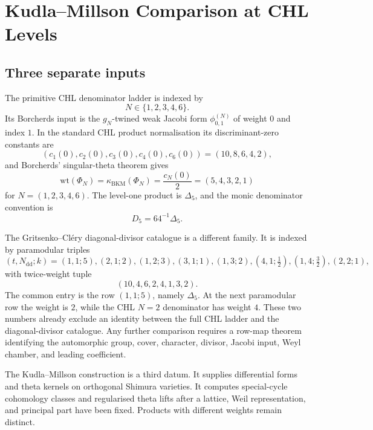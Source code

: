 \providecommand{\kBKM}{\kappa_{\mathrm{BKM}}}
\providecommand{\kch}{\kappa_{\mathrm{ch}}}
\providecommand{\kcat}{\kappa_{\mathrm{cat}}}
\providecommand{\kfib}{\kappa_{\mathrm{fiber}}}
\providecommand{\Sp}{\mathrm{Sp}}
\providecommand{\GSpin}{\mathrm{GSpin}}
\providecommand{\Sh}{\mathrm{Sh}}
\providecommand{\KM}{\mathrm{KM}}
\providecommand{\wt}{\mathrm{wt}}
\providecommand{\Hol}{\mathrm{Hol}}
\providecommand{\PP}{\mathrm{PP}}
\providecommand{\cO}{\mathcal{O}}
\providecommand{\bH}{\mathbb{H}}
\providecommand{\bQ}{\mathbb{Q}}
\providecommand{\bZ}{\mathbb{Z}}
\providecommand{\DeltaFive}{\Delta_5}
\providecommand{\Dfive}{D_5}

\section*{Kudla--Millson Comparison at CHL Levels}
\label{sec:kudla-millson-chl-levels}

\subsection*{Three separate inputs}

The primitive CHL denominator ladder is indexed by
\[
  N\in\{1,2,3,4,6\}.
\]
Its Borcherds input is the \(g_N\)-twined weak Jacobi form
\(\phi^{(N)}_{0,1}\) of weight \(0\) and index \(1\).  In the
standard CHL product normalisation its discriminant-zero constants are
\[
  (c_1(0),c_2(0),c_3(0),c_4(0),c_6(0))
  =
  (10,8,6,4,2),
\]
and Borcherds' singular-theta theorem gives
\[
  \wt(\Phi_N)=\kBKM(\Phi_N)=\frac{c_N(0)}2
  =
  (5,4,3,2,1)
\]
for \(N=(1,2,3,4,6)\).  The level-one product is
\(\DeltaFive\), and the monic denominator convention is
\[
  \Dfive=64^{-1}\DeltaFive .
\]

The Gritsenko--Cl\'ery diagonal-divisor catalogue is a different
family.  It is indexed by paramodular triples
\[
 (t,N_{\mathrm{dd}};k)=
 (1,1;5),(2,1;2),(1,2;3),(3,1;1),(1,3;2),
 (4,1;\tfrac12),(1,4;\tfrac32),(2,2;1),
\]
with twice-weight tuple
\[
  (10,4,6,2,4,1,3,2).
\]
The common entry is the row \((1,1;5)\), namely \(\DeltaFive\).  At the
next paramodular row the weight is \(2\), while the CHL \(N=2\)
denominator has weight \(4\).  These two numbers already exclude an
identity between the full CHL ladder and the diagonal-divisor catalogue.
Any further comparison requires a row-map theorem identifying the
automorphic group, cover, character, divisor, Jacobi input, Weyl
chamber, and leading coefficient.

The Kudla--Millson construction is a third datum.  It supplies
differential forms and theta kernels on orthogonal Shimura varieties.
It computes special-cycle cohomology classes and regularised theta
lifts after a lattice, Weil representation, and principal part have
been fixed.  Products with different weights remain distinct.

